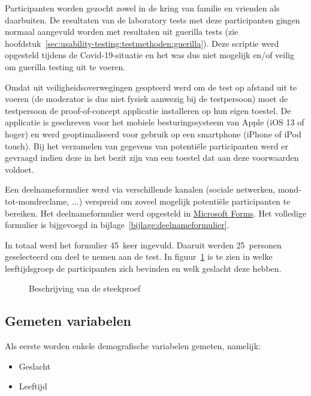 Participanten worden gezocht zowel in de kring van familie en vrienden als daarbuiten. De resultaten van de laboratory tests met deze participanten gingen normaal aangevuld worden met resultaten uit guerilla tests (zie hoofdstuk~\ref{sec:usability-testing:testmethoden:guerilla}). Deze scriptie werd opgesteld tijdens de Covid-19-situatie en het was dus niet mogelijk en/of veilig om guerilla testing uit te voeren.

Omdat uit veiligheidsoverwegingen geopteerd werd om de test op afstand uit te voeren (de moderator is dus niet fysiek aanwezig bij de testpersoon) moet de testpersoon de proof-of-concept applicatie installeren op hun eigen toestel. De applicatie is geschreven voor het mobiele besturingssysteem van Apple (iOS 13 of hoger) en werd geoptimaliseerd voor gebruik op een smartphone (iPhone of iPod touch). Bij het verzamelen van gegevens van potentiële participanten werd er gevraagd indien deze in het bezit zijn van een toestel dat aan deze voorwaarden voldoet.

Een deelnameformulier werd via verschillende kanalen (sociale netwerken, mond-tot-mondreclame, ...) verspreid om zoveel mogelijk potentiële participanten te bereiken. Het deelnameformulier werd opgesteld in \href{https://forms.office.com/}{Microsoft Forms}. Het volledige formulier is bijgevoegd in bijlage~\ref{bijlage:deelnameformulier}.

In totaal werd het formulier 45~keer ingevuld. Daaruit werden 25~personen geselecteerd om deel te nemen aan de test. In figuur~\ref{fig:beschrijving-steekproef} is te zien in welke leeftijdsgroep de participanten zich bevinden en welk geslacht deze hebben.

\begin{figure}[h!]
    \centering
    \qquad
    \caption{Beschrijving van de steekproef}
    \label{fig:beschrijving-steekproef}
\end{figure}

\subsection{Gemeten variabelen}
\label{sec:experiment:variabelen}

Als eerste worden enkele demografische variabelen gemeten, namelijk:
\begin{itemize}
    \item Geslacht
    \item Leeftijd
\end{itemize}

